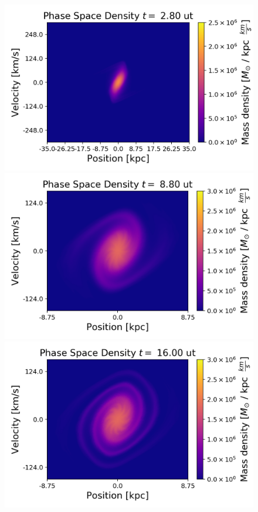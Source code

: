 \begin{figure}[h!]
    \centering
    \includegraphics[scale=0.45]{imag/gauss7.png}
    \includegraphics[scale=0.45]{imag/gauss22.png}
    \includegraphics[scale=0.45]{imag/gauss40.png}

\end{figure}
